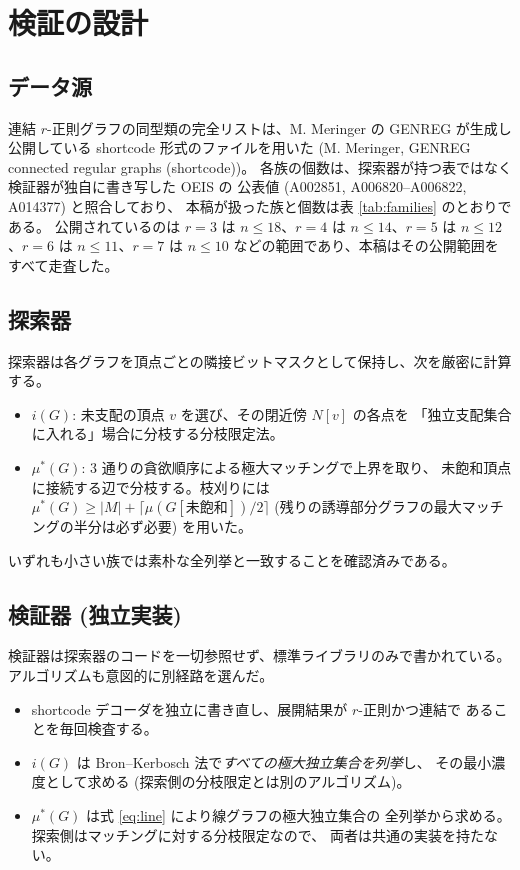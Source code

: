 \documentclass[paper=a4,fontsize=10.5pt,jafontsize=10.5pt]{jlreq}
\theoremstyle{plain}
\theoremstyle{definition}
\begin{document}
\section{検証の設計}\label{sec:method}

\subsection{データ源}

連結 $r$-正則グラフの同型類の完全リストは、M. Meringer の GENREG \cite{genreg}
が生成し公開している shortcode 形式のファイルを用いた (M. Meringer, GENREG connected regular graphs (shortcode))。
各族の個数は、探索器が持つ表ではなく検証器が独自に書き写した OEIS の
公表値 (A002851, A006820--A006822, A014377) と照合しており、
本稿が扱った族と個数は表 \ref{tab:families} のとおりである。
公開されているのは $r=3$ は $n \le 18$、$r=4$ は $n \le 14$、$r=5$ は $n \le 12$、$r=6$ は $n \le 11$、$r=7$ は $n \le 10$ などの範囲であり、本稿はその公開範囲を
すべて走査した。

\subsection{探索器}

探索器は各グラフを頂点ごとの隣接ビットマスクとして保持し、次を厳密に計算する。

\begin{itemize}
\item $i(G)$: 未支配の頂点 $v$ を選び、その閉近傍 $N[v]$ の各点を
      「独立支配集合に入れる」場合に分枝する分枝限定法。
\item $\mu^*(G)$: 3 通りの貪欲順序による極大マッチングで上界を取り、
      未飽和頂点に接続する辺で分枝する。枝刈りには
      $\mu^*(G) \ge |M| + \lceil \mu(G[\text{未飽和}])/2 \rceil$
      (残りの誘導部分グラフの最大マッチングの半分は必ず必要) を用いた。
\end{itemize}

いずれも小さい族では素朴な全列挙と一致することを確認済みである。

\subsection{検証器 (独立実装)}

検証器は探索器のコードを一切参照せず、標準ライブラリのみで書かれている。
アルゴリズムも意図的に別経路を選んだ。

\begin{itemize}
\item shortcode デコーダを独立に書き直し、展開結果が $r$-正則かつ連結で
      あることを毎回検査する。
\item $i(G)$ は Bron--Kerbosch 法で\emph{すべての極大独立集合を列挙}し、
      その最小濃度として求める (探索側の分枝限定とは別のアルゴリズム)。
\item $\mu^*(G)$ は式 \eqref{eq:line} により線グラフの極大独立集合の
      全列挙から求める。探索側はマッチングに対する分枝限定なので、
      両者は共通の実装を持たない。
\end{itemize}
\end{document}
